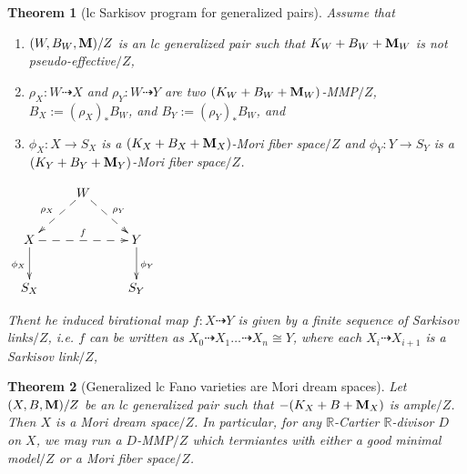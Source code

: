 \documentclass[11pt]{amsart}
\numberwithin{equation}{section}
\newcommand{\Mm}{{\bf{M}}}
\newcommand{\Rr}{\mathbb{R}}
\newtheorem{thm}{Theorem}[section]
\theoremstyle{definition}
\theoremstyle{definition}
\theoremstyle{definition}
\begin{document}
\begin{thm}[lc Sarkisov program for generalized pairs]\label{thm: lc Sarkisov program gpair}
Assume that
\begin{enumerate}
    \item $(W,B_W,\Mm)/Z$ is an lc generalized pair such that $K_W+B_W+\Mm_W$ is not pseudo-effective$/Z$,
    \item $\rho_X: W\dashrightarrow X$ and $\rho_Y: W\dashrightarrow Y$ are two $(K_W+B_W+\Mm_W)$-MMP$/Z$, $B_X:=(\rho_X)_*B_W$, and $B_Y:=(\rho_Y)_*B_W$, and
    \item $\phi_X: X\rightarrow S_X$ is a $(K_X+B_X+\Mm_X)$-Mori fiber space$/Z$ and $\phi_Y: Y\rightarrow S_Y$ is a $(K_Y+B_Y+\Mm_Y)$-Mori fiber space$/Z$.
\end{enumerate}
\begin{center}$\xymatrix{
 & W\ar@{-->}[dl]_{\rho_X}\ar@{-->}[dr]^{\rho_Y}& \\
      X \ar@{->}[d]_{\phi_X}\ar@{-->}[rr]^{f}   &  & Y\ar@{->}[d]^{\phi_Y} \\
    S_X & &S_Y }$
\end{center}
Thent he induced birational map $f: X\dashrightarrow Y$ is given by a finite sequence of Sarkisov links$/Z$, i.e. $f$ can be written as $X_0\dashrightarrow X_1\dots\dashrightarrow X_n\cong Y$, where each $X_{i}\dashrightarrow X_{i+1}$ is a Sarkisov link$/Z$,
\end{thm}

\begin{thm}[Generalized lc Fano varieties are Mori dream spaces]
    Let $(X,B,\Mm)/Z$ be an lc generalized pair such that $-(K_X+B+\Mm_X)$ is ample$/Z$. Then $X$ is a Mori dream space$/Z$. In particular, for any $\Rr$-Cartier $\Rr$-divisor $D$ on $X$, we may run a $D$-MMP$/Z$ which termiantes with either a good minimal model$/Z$ or a Mori fiber space$/Z$.
\end{thm}
\end{document}
